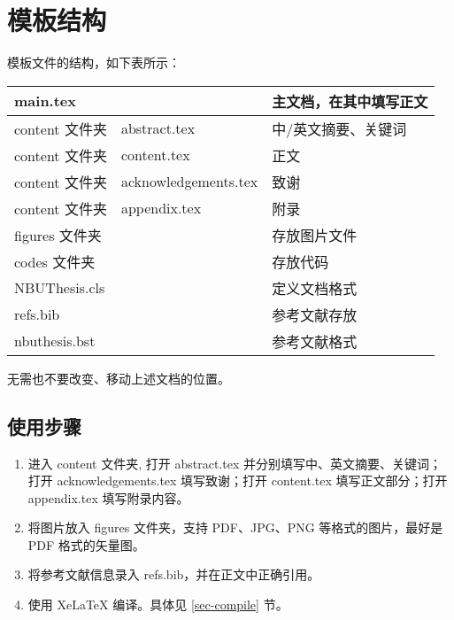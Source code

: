 

\chapter{模板结构}

模板文件的结构，如下表所示：
\begin{table}[ht]\centering
\begin{tabular}{r|l|l}
\hline
\multicolumn{2}{l|}{main.tex }       & 主文档，在其中填写正文  \\ \hline
content 文件夹 & abstract.tex         & 中/英文摘要、关键词     \\ \cline{2-3} \hline
content 文件夹 & content.tex          & 正文                     \\ \hline
content 文件夹 & acknowledgements.tex & 致谢                     \\ \hline
content 文件夹 & appendix.tex         & 附录                     \\ \hline
\multicolumn{2}{l|}{figures 文件夹}   & 存放图片文件            \\ \hline
\multicolumn{2}{l|}{codes 文件夹}     & 存放代码                \\ \hline
\multicolumn{2}{l|}{NBUThesis.cls}   & 定义文档格式             \\ \hline
\multicolumn{2}{l|}{refs.bib}        & 参考文献存放             \\ \hline
\multicolumn{2}{l|}{nbuthesis.bst}   & 参考文献格式             \\ \hline
\end{tabular}
\end{table}

无需也不要改变、移动上述文档的位置。

\section{使用步骤}

\begin{enumerate}
\item 进入 content 文件夹, 打开 abstract.tex 并分别填写中、英文摘要、关键词；打开 acknowledgements.tex 填写致谢；打开 content.tex 填写正文部分；打开 appendix.tex 填写附录内容。

\item 将图片放入 figures 文件夹，支持 PDF、JPG、PNG 等格式的图片，最好是 PDF 格式的矢量图。

\item 将参考文献信息录入 refs.bib，并在正文中正确引用。

\item 使用 XeLaTeX 编译。具体见 \ref{sec-compile} 节。
\end{enumerate}

